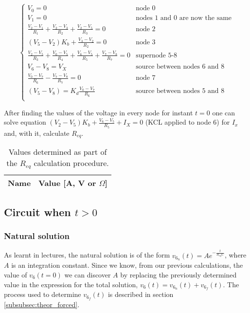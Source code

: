 \begin{equation}
  \begin{cases}
  V_0=0 & \mbox{node 0} \\
  V_1=0 & \mbox{nodes 1 and 0 are now the same} \\
  \frac{V_2-V_1}{R_1}+\frac{V_2-V_3}{R_2}+\frac{V_2-V_5}{R_3} = 0 & \mbox{node 2} \\
  (V_5-V_2)K_b + \frac{V_3-V_2}{R_2} = 0 & \mbox{node 3} \\
  \frac{V_2-V_5}{R_3} + \frac{V_0-V_5}{R_4} + \frac{V_6-V_5}{R_5} + \frac{V_7-V_8}{R_7} = 0 & \mbox{supernode 5-8} \\ 
  V_6-V_8 = V_X & \mbox{source between nodes 6 and 8} \\
  \frac{V_0-V_7}{R_6} - \frac{V_7-V_8}{R_7} = 0 & \mbox{node 7} \\
  (V_5-V_8) = K_d \frac{V_0-V_7}{R_6} & \mbox{source between nodes 5 and 8} \\
  \end{cases}
\end{equation}

After finding the values of the voltage in every node for instant $t=0$ one can solve equation $(V_2-V_5)K_b + \frac{V_6-V_5}{R_5} + I_X = 0$ (KCL applied to node 6) for $I_x$ and, with it, calculate $R_{eq}$.


\begin{table}[H]
  \centering
  \begin{tabular}{|c|c|}
    \hline    
    {\bf Name} & {\bf Value [A, V or $\Omega$]} \\ \hline
    
  \end{tabular}
  \caption{Values determined as part of the $R_{eq}$ calculation procedure.}
  \label{tab:t=0}
\end{table}



\subsection{Circuit when $t>0$}

\subsubsection{Natural solution}  %
As learnt in lectures, the natural solution is of the form $v_{6_{n}}(t) = A e^{-\frac{t}{R_{eq}C}}$, where $A$ is an integration constant.
Since we know, from our previous calculations, the value of $v_{6}(t=0)$ we can discover $A$ by replacing the previously determined value in the expression for the total solution, $v_6(t) = v_{6_n}(t) + v_{6_f}(t)$. The process used to determine $v_{6_f}(t)$ is described in section \ref{subsubsec:theor_forced}. 

